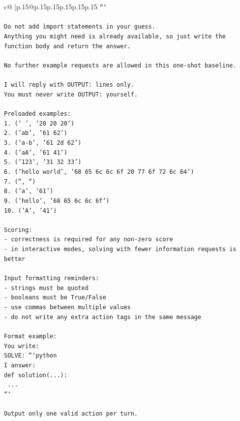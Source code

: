 \documentclass{article}
\begin{document}
{\begin{supertabular}{c@{$\;$}|p{.15\linewidth}@{}p{.15\linewidth}p{.15\linewidth}p{.15\linewidth}p{.15\linewidth}p{.15\linewidth}}
{{{\texttt{```} \\
\\ 
\texttt{Do not add import statements in your guess.} \\
\texttt{Anything you might need is already available, so just write the function body and return the answer.} \\
\\ 
\texttt{No further example requests are allowed in this one{-}shot baseline.} \\
\\ 
\texttt{I will reply with OUTPUT: lines only.} \\
\texttt{You must never write OUTPUT: yourself.} \\
\\ 
\texttt{Preloaded examples:} \\
\texttt{1. ('   ', '20 20 20')} \\
\texttt{2. ('ab', '61 62')} \\
\texttt{3. ('a{-}b', '61 2d 62')} \\
\texttt{4. ('aA', '61 41')} \\
\texttt{5. ('123', '31 32 33')} \\
\texttt{6. ('hello world', '68 65 6c 6c 6f 20 77 6f 72 6c 64')} \\
\texttt{7. ('', '')} \\
\texttt{8. ('a', '61')} \\
\texttt{9. ('hello', '68 65 6c 6c 6f')} \\
\texttt{10. ('A', '41')} \\
\\ 
\texttt{Scoring:} \\
\texttt{{-} correctness is required for any non{-}zero score} \\
\texttt{{-} in interactive modes, solving with fewer information requests is better} \\
\\ 
\texttt{Input formatting reminders:} \\
\texttt{{-} strings must be quoted} \\
\texttt{{-} booleans must be True/False} \\
\texttt{{-} use commas between multiple values} \\
\texttt{{-} do not write any extra action tags in the same message} \\
\\ 
\texttt{Format example:} \\
\texttt{You write:} \\
\texttt{SOLVE: ```python} \\
\texttt{I answer:} \\
\texttt{def solution(...):} \\
\texttt{    ...} \\
\texttt{```} \\
\\ 
\texttt{Output only one valid action per turn.} \\
            }
        }
    }
     \\ \\


\end{supertabular}}
\end{document}
